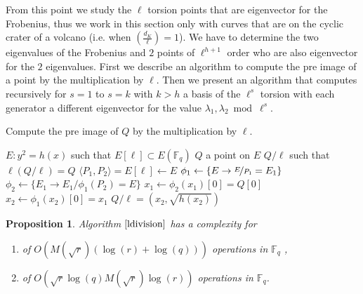 \documentclass{lms}
\newtheorem{prop}[thm]{Proposition}
\begin{document}
From this point we study the $\ell$ torsion points that are eigenvector for the Frobenius, thus we work in this section only with curves that are on the cyclic crater of a volcano (i.e. when $\left( \frac{d_K}{\ell} \right)=1$). We have to determine  the two eigenvalues of the Frobenius and $2$ points of $\ell^{h+1}$ order who are also eigenvector for the $2$ eigenvalues. First we describe an algorithm to compute the pre image of a point by the multiplication by $\ell$. Then we present an algorithm that computes recursively for $s=1$ to $s=k$ with $k>h$ a basis of the $\ell^s$ torsion with each generator a different eigenvector for the value $\lambda_1, \lambda_2 \bmod \ell^s$.

\begin{algorithm}
\caption{\label{ldivision}Compute the pre image of $Q$ by the multiplication by $\ell$.}
\begin{algorithmic}[5]
\REQUIRE  $E: y^2=h(x)$ such that $E[\ell] \subset E(\mathbb{F}_q)$ %
\STATE $Q$ a point on $E$
\ENSURE $Q/\ell$ such that $\ell(Q/\ell)=Q$
\STATE $ \langle P_1,P_2 \rangle = E[\ell] \gets E $
\STATE $\phi_1  \gets \lbrace E\rightarrow \nicefrac{E}{P_1}=E_1 \rbrace $
\STATE $\phi_2  \gets \lbrace E_1\rightarrow {E_1}/{\phi_1(P_2)}=E \rbrace $
\STATE $x_1 \gets \phi_2(x_1)[0]=Q[0] $
\STATE $x_2 \gets \phi_1(x_2)[0]=x_1  $
\RETURN $Q/\ell=(x_2,\sqrt{h(x_2)})$
\end{algorithmic}
\end{algorithm}

\begin{prop}
Algorithm $\ref{ldivision}$ has a complexity for
\begin{enumerate}
\item[$\ell = 2$] of $O(M(\sqrt{r})(\log(r)+\log(q)))$ operations in $\mathbb{F}_q$ ,
\item[$\ell \neq 2$]of $O(\sqrt{r} \log(q) M(\sqrt{r})\log(r))$ operations in $\mathbb{F}_q$.
\end{enumerate}
 
\end{prop}
\end{document}
